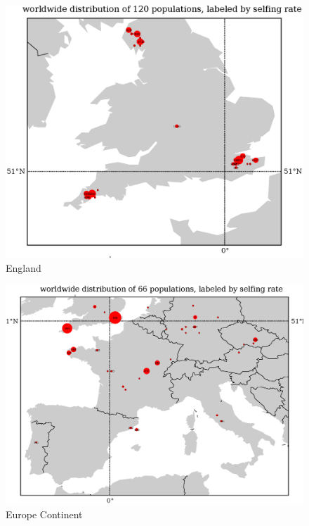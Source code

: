 \documentclass[a4paper,10pt]{article}
\begin{document}
\begin{figure}
\includegraphics[width=1\textwidth]{figures/s0829popid2ecotypeid_5_Eng__7_49_2_55_l3y1_pop_map.eps}
\caption{England}\label{f23}
\end{figure}


\begin{figure}
\includegraphics[width=1\textwidth]{figures/s0829popid2ecotypeid_25_EurCont__10_35_20_53_l3y1_pop_map.eps}
\caption{Europe Continent}\label{f15}
\end{figure}
\end{document}
